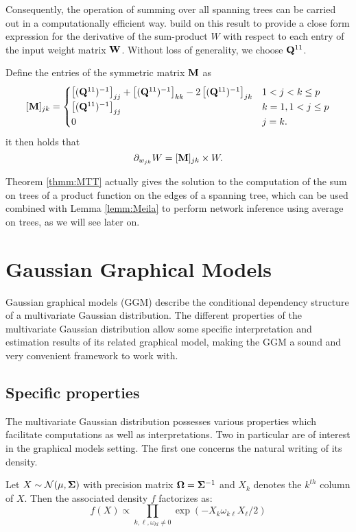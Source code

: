 Consequently, the operation of summing over all spanning trees can be carried out in a computationally efficient way. \cite{MeilaJaak}  build on this result to provide a close form expression for the derivative of the sum-product $W$ with respect to each entry of the input weight matrix ${\bf W}$.   Without loss of generality, we choose ${\bf Q}^{11}$.

\begin{lemma}  \label{lemm:Meila}
    Define the entries of the symmetric matrix ${\bf M}$ as
\[    
 [{\bf M}]_{jk} =\begin{cases}
    \left[({\bf Q}^{11})^{-1}\right]_{jj} + \left[({\bf Q}^{11})^{-1}\right]_{kk} -2\left[({\bf Q}^{11})^{-1}\right]_{jk} & 1< j<k \leq p\\
    \left[({\bf Q}^{11})^{-1}\right]_{jj} & k=1, 1< j \leq p  \\
    0 &  j=k .
    \end{cases}
\] 
it then holds that
$$\partial_{w_{jk}} W = [{\bf M}]_{jk}  \times W.$$
\end{lemma}

Theorem \ref{thmm:MTT} actually gives the solution to the computation of the sum on trees of a product function on the edges of a spanning tree, which can be used combined with  Lemma \ref{lemm:Meila} to perform network inference using average on trees, as we will see later on. 

 \section{Gaussian Graphical Models}
 Gaussian graphical models (GGM) describe the conditional dependency structure of a  multivariate Gaussian distribution. The different properties of the multivariate Gaussian distribution allow some specific interpretation and estimation results of its related graphical model,  making the GGM a sound and very convenient  framework to work with.
 
 \subsection{Specific properties} \label{ggm:prop}
The multivariate Gaussian distribution possesses various properties which facilitate computations as well as interpretations. Two in particular are of interest in the graphical models setting. The first one concerns the natural writing of its density.
 \begin{prop}\label{pp:ggm1}
 Let $X\sim \mathcal{N}(\mu, {\boldsymbol{\Sigma}})$ with precision matrix ${\boldsymbol{\Omega}}={\boldsymbol{\Sigma}}^{-1}$ and $X_k$ denotes the $k^{th}$ column of $X$. Then the associated density $f$ factorizes as:
 $$f(X) \propto \prod_{k,\ell, \omega_{kl}\neq 0} \exp(-X_{k}\omega_{k\ell}X_{\ell}/2)$$
 \end{prop}
 
